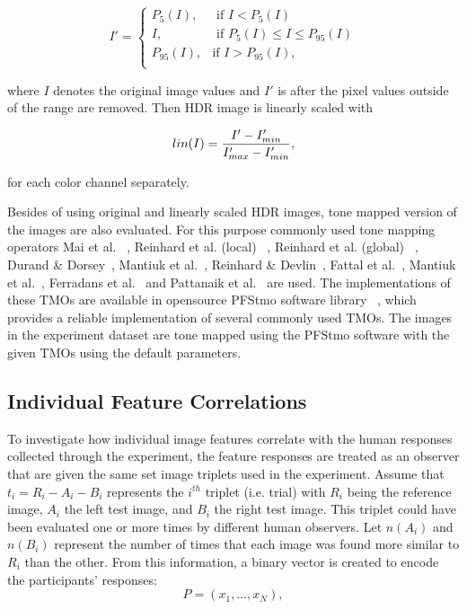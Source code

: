 \begin{equation}
    I' = \begin{cases}
    P_5 (I), &\text{ if $I < P_5(I)$} \\
    I, &\text{ if $P_5(I) \leq I \leq P_{95}(I) $} \\
    P_{95}(I), &\text{if $I > P_{95}(I)$}, \\
    \end{cases}
\end{equation}

where $I$ denotes the original image values and $I'$ is after the pixel values outside of the range are removed. Then HDR image is linearly scaled with

\begin{equation}
    lin(I)  = {{I' - I'_{min}} \over {I'_{max} - I'_{min}}}, 
\end{equation}

for each color channel separately.

Besides of using original and linearly scaled HDR images, tone mapped version of the images are also evaluated. For this purpose commonly used tone mapping operators Mai et al. ~\cite{mai2010optimizing}, Reinhard et al. (local) ~\cite{reinhard2002photographic}, Reinhard et al. (global) ~\cite{reinhard2002photographic}, Durand \& Dorsey~\cite{durand2002fast}, Mantiuk et al.~\cite{mantiuk2006perceptual}, Reinhard \& Devlin~\cite{reinhard2005dynamic}, Fattal et al.~\cite{durand2002fast}, Mantiuk et al.~\cite{mantiuk2008display}, Ferradans et al.~\cite{ferradans2011analysis} and Pattanaik et al.~\cite{pattanaik2000time} are used. The implementations of these TMOs are available in opensource PFStmo software library ~\cite{mantiuk2007high}, which provides a reliable implementation of several commonly used TMOs. The images in the experiment dataset are tone mapped using the PFStmo software with the given TMOs using the default parameters.


\subsection{Individual Feature Correlations}
To investigate how individual image features correlate with the human responses collected through the experiment, the feature responses are treated as an observer that are given the same set image triplets used in the experiment. Assume that $t_i = R_i-A_i-B_i$ represents the $i^{th}$ triplet (i.e. trial) with $R_i$ being the reference image, $A_i$ the left test image, and $B_i$ the right test image. This triplet could have been evaluated one or more times by different human observers. Let $n(A_i)$ and $n(B_i)$ represent the number of times that each image was found more similar to $R_i$ than the other. From this information, a binary vector is created to encode the participants’ responses:
\begin{equation}
\label{eq:p_vector}
P = (x_1, \ldots, x_N),
\end{equation}

